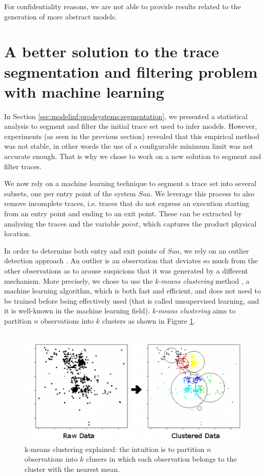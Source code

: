 For confidentiality reasons, we are not able to provide results
related to the generation of more abstract models.


\section{A better solution to the trace segmentation and
filtering problem with machine learning}
\label{sec:testing:segmentation}

In Section \ref{sec:modelinf:prodsystems:segmentation}, we
presented a statistical analysis to segment and filter the
initial trace set used to infer models. However, experiments (as
seen in the previous section) revealed that this empirical method
was not stable, in other words the use of a configurable minimum
limit was not accurate enough. That is why we chose to work on a
new solution to segment and filter traces.

We now rely on a machine learning technique to segment a trace
set into several subsets, one per entry point of the system
$\mathit{Sua}$. We leverage this process to also remove
incomplete traces, i.e. traces that do not express an execution
starting from an entry point and ending to an exit point. These
can be extracted by analysing the traces and the variable
$point$, which captures the product physical location.

In order to determine both entry and exit points of
$\mathit{Sua}$, we rely on an outlier detection approach
\cite{1695852}. An outlier is an observation that deviates so
much from the other observations as to arouse suspicions that it
was generated by a different mechanism. More precisely, we chose
to use the \textit{k-means clustering} method
\cite{10.2307/2346830}, a machine learning algorithm, which is
both fast and efficient, and does not need to be trained before
being effectively used (that is called unsupervised learning, and
it is well-known in the machine learning field). \textit{k-means
clustering} aims to partition $n$ observations into $k$ clusters
as shown in Figure \ref{fig:kmeans}.

\begin{figure}[ht]
    \includegraphics[width=1.0\linewidth]{figures/kmeans.png}

    \caption{k-means clustering explained: the intuition is to
    partition $n$ observations into $k$ clusers in which each
    observation belongs to the cluster with the nearest mean.}
    \label{fig:kmeans}
\end{figure}

